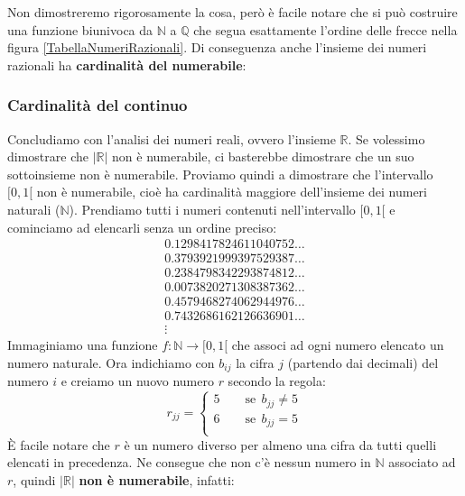 Non dimostreremo rigorosamente la cosa, però è facile notare che si può costruire una funzione biunivoca da $\mathbb{N}$ a $\mathbb{Q}$ che segua esattamente l'ordine delle frecce nella figura \ref{TabellaNumeriRazionali}. Di conseguenza anche l'insieme dei numeri razionali ha \textbf{cardinalità del numerabile}:

\subsubsection{Cardinalità del continuo} %
Concludiamo con l'analisi dei numeri reali, ovvero l'insieme $\mathbb{R}$. Se volessimo dimostrare che $|\mathbb{R}|$ non è numerabile, ci basterebbe dimostrare che un suo sottoinsieme non è numerabile. Proviamo quindi a dimostrare che l'intervallo $[0, 1[$ non è numerabile, cioè ha cardinalità maggiore dell'insieme dei numeri naturali ($\mathbb{N}$). Prendiamo tutti i numeri contenuti nell'intervallo $[0,1[$ e cominciamo ad elencarli senza un ordine preciso:
\begin{align*}
    0.1298417824611040752 \dots\\
    0.3793921999397529387 \dots\\
    0.2384798342293874812 \dots\\
    0.0073820271308387362 \dots\\
    0.4579468274062944976 \dots\\
    0.7432686162126636901 \dots\\
    \vdots \qquad \qquad \qquad
\end{align*}
Immaginiamo una funzione $f: \mathbb{N} \to [0,1[$ che associ ad ogni numero elencato un numero naturale. Ora indichiamo con $b_{ij}$ la cifra $j$ (partendo dai decimali) del numero $i$ e creiamo un nuovo numero $r$ secondo la regola:
\begin{equation*}
    r_{jj} = 
    \begin{cases}
    5 \qquad \mathrm{se}\;\,b_{jj} \neq 5\\
    6 \qquad \mathrm{se}\;\,b_{jj} = 5\\
    \end{cases}
\end{equation*}
È facile notare che $r$ è un numero diverso per almeno una cifra da tutti quelli elencati in precedenza. Ne consegue che non c'è nessun numero in $\mathbb{N}$ associato ad $r$, quindi $|\mathbb{R}|$ \textbf{non è numerabile}, infatti:
